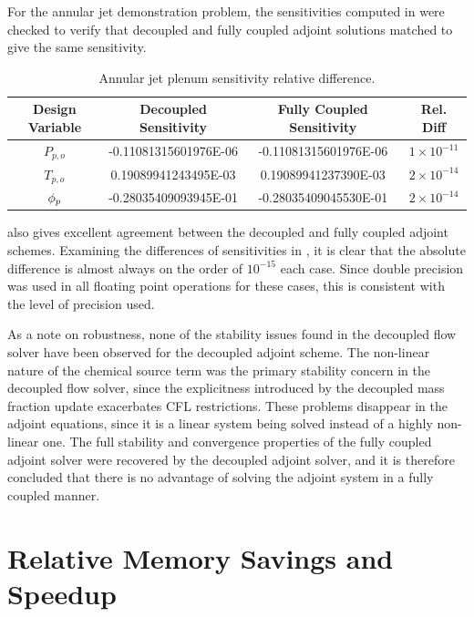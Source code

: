 For the annular jet demonstration problem, the sensitivities computed in
 were checked to verify that decoupled and fully
coupled adjoint solutions matched to give the same sensitivity.
\begin{table}[h]
  \centering
  \begin{tabular}{c|c|c|c}
    Design Variable & Decoupled Sensitivity & Fully Coupled Sensitivity & Rel. Diff\\
    \hline
    $P_{p,o}$ & -0.11081315601976E-06 & -0.11081315601976E-06 & $1 \times 10^{-11}$ \\
    $T_{p,o}$ &  0.19089941243495E-03 &  0.19089941237390E-03 & $2 \times 10^{-14}$ \\
    $\phi_p$     & -0.28035409093945E-01 & -0.28035409045530E-01 & $2 \times 10^{-14}$
  \end{tabular}
  \caption{Annular jet plenum sensitivity relative difference.}
  \label{tab:srp-adj-diff}
\end{table}
 also gives excellent agreement between the decoupled and
fully coupled adjoint schemes.  Examining the differences of sensitivities in
, it is clear
that the absolute difference is almost always on the order of $10^{-15}$ each
case.  Since double precision was used in all floating point operations for
these cases, this is consistent with the level of precision used.

As a note on robustness, none of the stability issues found in the decoupled
flow solver have been observed for the decoupled adjoint scheme.  The
non-linear nature of the chemical source term was the primary stability concern
in the decoupled flow solver, since the explicitness introduced by the decoupled
mass fraction update exacerbates CFL restrictions.  These problems disappear in
the adjoint equations, since it is a linear system being solved instead of a
highly non-linear one.  The full stability and convergence properties of the
fully coupled adjoint solver were recovered by the decoupled adjoint solver, and
it is therefore concluded that there is no advantage of solving the adjoint
system in a fully coupled manner.

\section{Relative Memory Savings and Speedup}
\label{sec:adj-cost-mem-savings}

